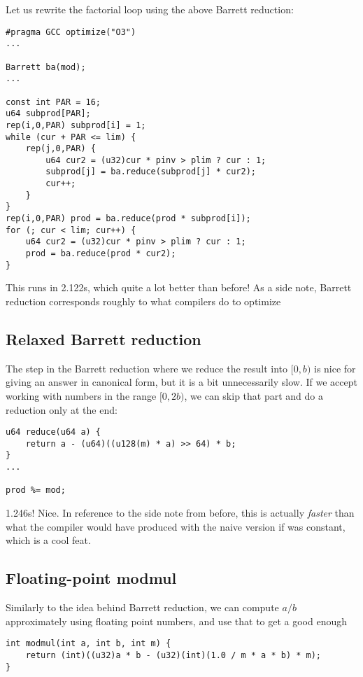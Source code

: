 Let us rewrite the factorial loop using the above Barrett reduction:
\begin{lstlisting}
#pragma GCC optimize("O3")
...

Barrett ba(mod);
...

const int PAR = 16;
u64 subprod[PAR];
rep(i,0,PAR) subprod[i] = 1;
while (cur + PAR <= lim) {
	rep(j,0,PAR) {
		u64 cur2 = (u32)cur * pinv > plim ? cur : 1;
		subprod[j] = ba.reduce(subprod[j] * cur2);
		cur++;
	}
}
rep(i,0,PAR) prod = ba.reduce(prod * subprod[i]);
for (; cur < lim; cur++) {
	u64 cur2 = (u32)cur * pinv > plim ? cur : 1;
	prod = ba.reduce(prod * cur2);
}
\end{lstlisting}
This runs in 2.122s, which quite a lot better than before!
As a side note, Barrett reduction corresponds roughly to what compilers do to optimize \verb@a % b@ where \verb@b@ is a compile-time constant.

\subsection{Relaxed Barrett reduction}
The step in the Barrett reduction where we reduce the result into $[0, b)$ is nice for giving an answer in canonical form, but it is a bit unnecessarily slow.
If we accept working with numbers in the range $[0, 2b)$, we can skip that part and do a reduction only at the end:
\begin{lstlisting}
u64 reduce(u64 a) {
	return a - (u64)((u128(m) * a) >> 64) * b;
}
...

prod %= mod;
\end{lstlisting}
1.246s! Nice.
In reference to the side note from before, this is actually \emph{faster} than what the compiler would have produced with the naive version if \verb@mod@ was constant, which is a cool feat.

\subsection{Floating-point modmul}

Similarly to the idea behind Barrett reduction, we can compute $a / b$ approximately using floating point numbers, and use that to get a good enough \verb@a % b@, in the range $(-(1+\epsilon)b, (1+\epsilon)b)$. We combine multiplication and reduction in order to keep to 32-bit integers, making use of integer overflow:

\begin{lstlisting}
int modmul(int a, int b, int m) {
	return (int)((u32)a * b - (u32)(int)(1.0 / m * a * b) * m);
}
\end{lstlisting}

